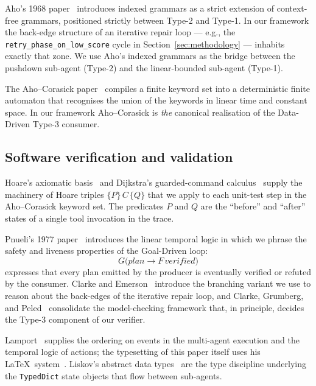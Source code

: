 Aho's 1968 paper~\cite{aho1968indexed} introduces indexed
grammars as a strict extension of context-free grammars,
positioned strictly between Type-2 and Type-1.  In our framework
the back-edge structure of an iterative repair loop --- e.g.,
the \texttt{retry\_phase\_on\_low\_score} cycle in
Section~\ref{sec:methodology} --- inhabits exactly that zone.  We
use Aho's indexed grammars as the bridge between the pushdown
sub-agent (Type-2) and the linear-bounded sub-agent (Type-1).

The Aho--Corasick paper~\cite{aho1975corasick} compiles a finite
keyword set into a deterministic finite automaton that recognises
the union of the keywords in linear time and constant space.  In
our framework Aho--Corasick is \emph{the} canonical realisation
of the Data-Driven Type-3 consumer.

\subsection{Software verification and validation}

Hoare's axiomatic basis~\cite{hoare1969axiomatic} and Dijkstra's
guarded-command calculus~\cite{dijkstra1975guarded} supply the
machinery of Hoare triples $\{P\}\,C\,\{Q\}$ that we apply to
each unit-test step in the Aho--Corasick keyword set.  The
predicates $P$ and $Q$ are the ``before'' and ``after'' states
of a single tool invocation in the trace.

Pnueli's 1977 paper~\cite{pnueli1977temporal} introduces the
linear temporal logic in which we phrase the safety and
liveness properties of the Goal-Driven loop:
\[
G\bigl(\mathit{plan} \rightarrow F\,\mathit{verified}\bigr)
\]
expresses that every plan emitted by the producer is eventually
verified or refuted by the consumer.  Clarke and
Emerson~\cite{clarke1981ctl} introduce the branching variant we
use to reason about the back-edges of the iterative repair loop,
and Clarke, Grumberg, and Peled~\cite{clarke1999modelchecking}
consolidate the model-checking framework that, in principle,
decides the Type-3 component of our verifier.

Lamport~\cite{lamport1978clocks,lamport1994tla} supplies the
ordering on events in the multi-agent execution and the temporal
logic of actions; the typesetting of this paper itself uses his
\LaTeX\ system~\cite{lamport1986latex}.  Liskov's abstract data
types~\cite{liskov1974abstraction} are the type discipline
underlying the \texttt{TypedDict} state objects that flow between
sub-agents.

